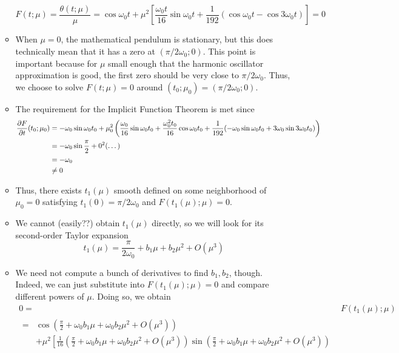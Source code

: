 \documentclass[../notes.tex]{subfiles}
\begin{document}
\begin{itemize}
\begin{itemize}
        \begin{equation*}
            F(t;\mu) = \frac{\theta(t;\mu)}{\mu}
            = \cos\omega_0t+\mu^2\left[ \frac{\omega_0t}{16}\sin\omega_0t+\frac{1}{192}(\cos\omega_0t-\cos 3\omega_0t) \right]
            = 0
        \end{equation*}
        \item When $\mu=0$, the mathematical pendulum is stationary, but this does technically mean that it has a zero at $(\pi/2\omega_0;0)$. This point is important because for $\mu$ small enough that the harmonic oscillator approximation is good, the first zero should be very close to $\pi/2\omega_0$. Thus, we choose to solve $F(t;\mu)=0$ around $(t_0;\mu_0)=(\pi/2\omega_0;0)$.
        \item The requirement for the Implicit Function Theorem is met since
        \begin{align*}
            {\pdv{F}{t}}(t_0;\mu_0) &= -\omega_0\sin\omega_0t_0+\mu_0^2\left( \frac{\omega_0}{16}\sin\omega_0t_0+\frac{\omega_0^2t_0}{16}\cos\omega_0t_0+\frac{1}{192}(-\omega_0\sin\omega_0t_0+3\omega_0\sin 3\omega_0t_0) \right)\\
            &= -\omega_0\sin\frac{\pi}{2}+0^2(\dots)\\
            &= -\omega_0\\
            &\neq 0
        \end{align*}
        \item Thus, there exists $t_1(\mu)$ smooth defined on some neighborhood of $\mu_0=0$ satisfying $t_1(0)=\pi/2\omega_0$ and $F(t_1(\mu);\mu)=0$.
        \item We cannot (easily??) obtain $t_1(\mu)$ directly, so we will look for its second-order Taylor expansion
        \begin{equation*}
            t_1(\mu) = \frac{\pi}{2\omega_0}+b_1\mu+b_2\mu^2+O(\mu^3)
        \end{equation*}
        \item We need not compute a bunch of derivatives to find $b_1,b_2$, though. Indeed, we can just substitute into $F(t_1(\mu);\mu)=0$ and compare different powers of $\mu$. Doing so, we obtain
        \begin{align*}
            0 ={}& F(t_1(\mu);\mu)\\
            \begin{split}
                ={}& \cos(\frac{\pi}{2}+\omega_0b_1\mu+\omega_0b_2\mu^2+O(\mu^3))\\
                &+ \mu^2\left[ \frac{1}{16}\left( \frac{\pi}{2}+\omega_0b_1\mu+\omega_0b_2\mu^2+O(\mu^3) \right)\sin(\frac{\pi}{2}+\omega_0b_1\mu+\omega_0b_2\mu^2+O(\mu^3)) \right.\\

\end{split}
\end{align*}
\end{itemize}
\end{itemize}
\end{document}
